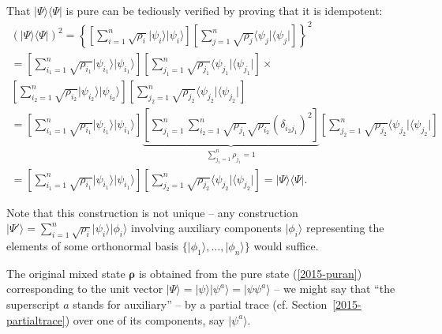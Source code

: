 {\color{OliveGreen}\bproof
That $\vert \Psi\rangle \langle \Psi \vert$ is pure can be tediously verified by proving that it is idempotent:
\begin{equation}
\begin{split}
(\vert \Psi\rangle \langle \Psi \vert )^2
=
\left\{
\left[\sum_{i=1}^n \sqrt{\rho_i}  \vert \psi_i\rangle  \vert \psi_i\rangle \right]
\left[\sum_{j=1}^n \sqrt{\rho_j}  \langle  \psi_j\vert \langle \psi_j\vert \right]
\right\}^2
\\=
\left[\sum_{i_1=1}^n \sqrt{\rho_{i_1}}  \vert \psi_{i_1}\rangle  \vert \psi_{i_1}\rangle \right]
\left[\sum_{j_1=1}^n \sqrt{\rho_{j_1}}  \langle  \psi_{j_1}\vert \langle \psi_{j_1}\vert \right]\times \\
\left[\sum_{i_2=1}^n \sqrt{\rho_{i_2}}  \vert \psi_{i_2}\rangle  \vert \psi_{i_2}\rangle \right]
\left[\sum_{j_2=1}^n \sqrt{\rho_{j_2}}  \langle  \psi_{j_2}\vert \langle \psi_{j_2}\vert \right]
\qquad
\\=
\left[\sum_{i_1=1}^n \sqrt{\rho_{i_1}}  \vert \psi_{i_1}\rangle  \vert \psi_{i_1}\rangle \right]
\underbrace{
\left[\sum_{j_1=1}^n \sum_{i_2=1}^n \sqrt{\rho_{j_1}}\sqrt{\rho_{i_2}}  (\delta_{i_2 j_1})^2 \right]
}_
{
 \sum_{j_1=1}^n   \rho_{j_1} = 1
}
\left[\sum_{j_2=1}^n \sqrt{\rho_{j_2}}  \langle  \psi_{j_2}\vert \langle \psi_{j_2}\vert \right]
\\=
\left[\sum_{i_1=1}^n \sqrt{\rho_{i_1}}  \vert \psi_{i_1}\rangle  \vert \psi_{i_1}\rangle \right]
\left[\sum_{j_2=1}^n \sqrt{\rho_{j_2}}  \langle  \psi_{j_2}\vert \langle \psi_{j_2}\vert \right]
 =  \vert \Psi\rangle \langle \Psi \vert
.
\label{2015-puranproof}
\end{split}
\end{equation}
}

Note that this construction is not unique -- any construction
$\vert \Psi' \rangle = \sum_{i=1}^n \sqrt{\rho_i}  \vert \psi_i\rangle  \vert \phi_i\rangle$
involving auxiliary components
$\vert \phi_i\rangle$
representing the elements of some orthonormal basis $\{\vert \phi_1\rangle , \ldots , \vert \phi_n\rangle \}$
would suffice.

The original mixed state ${\boldsymbol{\rho}}$ is obtained from the pure state (\ref{2015-puran})
corresponding to the unit vector $\vert \Psi\rangle = \vert \psi \rangle \vert \psi^a \rangle  = \vert \psi \psi^a \rangle$
-- we might say that ``the superscript $a$ stands for auxiliary'' --
by a partial trace (cf. Section~\ref{2015-partialtrace}) over one of its components, say  $\vert \psi^a\rangle$.

